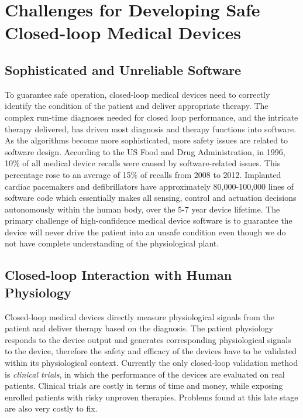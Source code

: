 \documentclass[a4paper]{article}
\begin{document}
\section{Challenges for Developing Safe Closed-loop Medical Devices}
\subsection{Sophisticated and Unreliable Software}
To guarantee safe operation, closed-loop medical devices need to correctly identify the condition of the patient and deliver appropriate therapy.
The complex run-time diagnoses needed for closed loop performance, and the intricate therapy delivered, has driven most diagnosis and therapy functions into software.
As the algorithms become more sophisticated, more safety issues are related to software design. 
According to the US Food and Drug Administration, in 1996, 10\% of all medical device recalls were caused by software-related issues. 
This percentage rose to an average of 15\% of recalls from 2008 to 2012. 
Implanted cardiac pacemakers and defibrillators have approximately 80,000-100,000 lines of software code which essentially makes all sensing, control and actuation decisions autonomously within the human body, over the 5-7 year device lifetime. 
The primary challenge of high-confidence medical device software is to guarantee the device will never drive the patient into an unsafe condition even though we do not have complete understanding of the physiological plant.  
\subsection{Closed-loop Interaction with Human Physiology}
Closed-loop medical devices directly measure physiological signals from the patient and deliver therapy based on the diagnosis.
The patient physiology responds to the device output and generates corresponding physiological signals to the device, therefore the safety and efficacy of the devices have to be validated within its physiological context.
Currently the only closed-loop validation method is \emph{clinical trials}, in which the performance of the devices are evaluated on real patients.
Clinical trials are costly in terms of time and money, while exposing enrolled patients with risky unproven therapies.
Problems found at this late stage are also very costly to fix.
\end{document}
